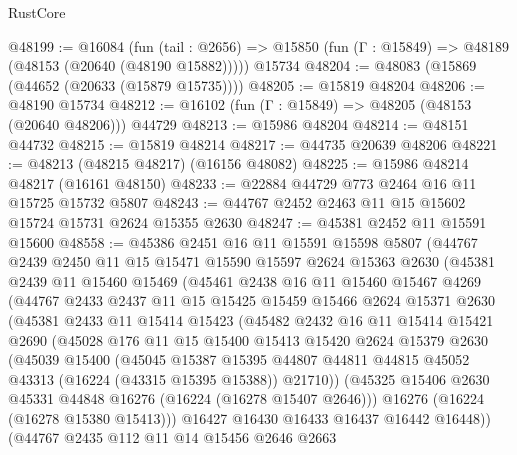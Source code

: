 \begin{lexlean}{RustCore}
\begin{coremodule}
@48199 := @16084
    (fun (tail : @2656) => @15850 (fun (Γ : @15849) => @48189 (@48153 (@20640 (@48190 @15882)))))
    @15734
@48204 := @48083 (@15869 (@44652 (@20633 (@15879 @15735))))
@48205 := @15819 @48204
@48206 := @48190 @15734
@48212 := @16102 (fun (Γ : @15849) => @48205 (@48153 (@20640 @48206))) @44729
@48213 := @15986 @48204
@48214 := @48151 @44732
@48215 := @15819 @48214
@48217 := @44735 @20639 @48206
@48221 := @48213 (@48215 @48217) (@16156 @48082)
@48225 := @15986 @48214 @48217 (@16161 @48150)
@48233 := @22884 @44729 @773 @2464 @16 @11 @15725 @15732 @5807
@48243 := @44767 @2452 @2463 @11 @15 @15602 @15724 @15731 @2624 @15355 @2630
@48247 := @45381 @2452 @11 @15591 @15600
@48558 := @45386
    @2451
    @16
    @11
    @15591
    @15598
    @5807
    (@44767
      @2439
      @2450
      @11
      @15
      @15471
      @15590
      @15597
      @2624
      @15363
      @2630
      (@45381
        @2439
        @11
        @15460
        @15469
        (@45461
          @2438
          @16
          @11
          @15460
          @15467
          @4269
          (@44767
            @2433
            @2437
            @11
            @15
            @15425
            @15459
            @15466
            @2624
            @15371
            @2630
            (@45381
              @2433
              @11
              @15414
              @15423
              (@45482
                @2432
                @16
                @11
                @15414
                @15421
                @2690
                (@45028
                  @176
                  @11
                  @15
                  @15400
                  @15413
                  @15420
                  @2624
                  @15379
                  @2630
                  (@45039
                    @15400
                    (@45045
                      @15387
                      @15395
                      @44807
                      @44811
                      @44815
                      @45052
                      @43313
                      (@16224 (@43315 @15395 @15388))
                      @21710))
                  (@45325 @15406 @2630 @45331 @44848 @16276 (@16224 (@16278 @15407 @2646)))
                  @16276
                  (@16224 (@16278 @15380 @15413)))
                @16427
                @16430
                @16433
                @16437
                @16442
                @16448))
            (@44767
              @2435
              @112
              @11
              @14
              @15456
              @2646
              @2663

\end{coremodule}
\end{lexlean}
